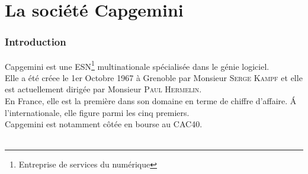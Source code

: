 \chapter{La société Capgemini}
\subsection*{Introduction}
Capgemini est une ESN\footnote{Entreprise de services du numérique} multinationale spécialisée dans le génie logiciel.
\\Elle a été créee le 1er Octobre 1967 à Grenoble par Monsieur \textsc{Serge Kampf} et elle est actuellement dirigée par  Monsieur \textsc{Paul Hermelin}.\\
En France, elle est la première dans son domaine en terme de chiffre d'affaire. \'A l'internationale, elle figure parmi les cinq premiers.
\\Capgemini est notamment côtée en bourse au CAC40.
\\\\
\begin{figure}[h]
\end{figure}

\newpage
